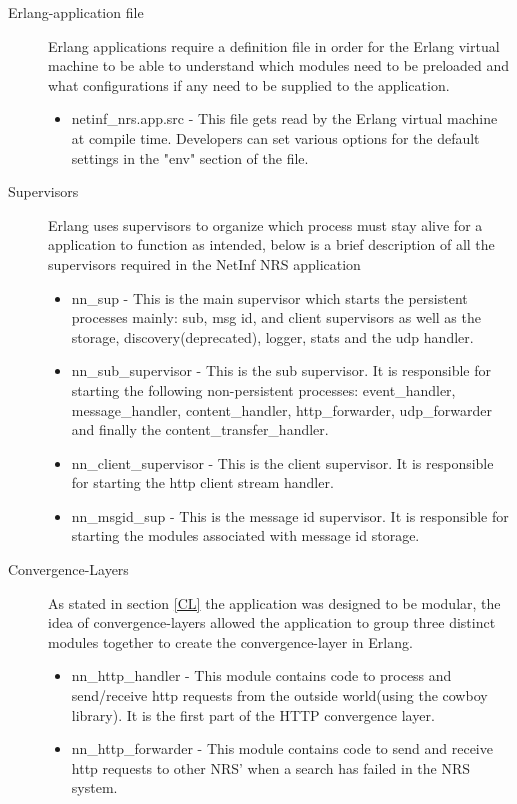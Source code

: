 \begin{description}
\item[Erlang-application file]
Erlang applications require a definition file in order for the Erlang virtual machine to be able to understand which modules need to be
preloaded and what configurations if any need to be supplied to the application.
\begin{itemize}
\item netinf\_nrs.app.src - This file gets read by the Erlang virtual machine at compile time. Developers can set various options for the 
default settings in the "env" section of the file.
\end{itemize}
\item[Supervisors]
Erlang uses supervisors to organize which process must stay alive for a application to function as intended, below is a brief description 
of all the supervisors required in the NetInf NRS application
\begin{itemize}
\item nn\_sup - This is the main supervisor which starts the persistent processes mainly: sub, msg id, and client supervisors as well as 
the storage, discovery(deprecated), logger, stats and the udp handler.
\item nn\_sub\_supervisor - This is the sub supervisor. It is responsible for starting the following non-persistent processes: event\_handler, 
message\_handler, content\_handler, http\_forwarder, udp\_forwarder and finally the content\_transfer\_handler.
\item nn\_client\_supervisor - This is the client supervisor. It is responsible for starting the http client stream handler. 
\item nn\_msgid\_sup - This is the message id supervisor. It is responsible for starting the modules associated with message id storage.
\end{itemize}
\item[Convergence-Layers]
As stated in section \ref{CL} the application was designed to be modular, the idea of convergence-layers allowed the application to group 
three distinct modules together to create the convergence-layer in Erlang.
\begin{itemize}
\item nn\_http\_handler - This module contains code to process and send/receive http requests from the outside world(using the cowboy library). 
It is the first part of the HTTP convergence layer.
\item nn\_http\_forwarder - This module contains code to send and receive http requests to other NRS' when a search has failed in the NRS system.

\end{itemize}
\end{description}
